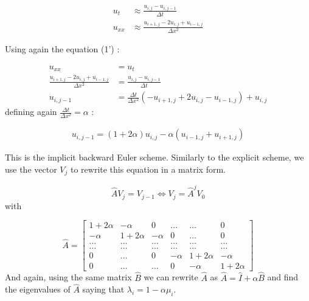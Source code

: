\documentclass[a4paper, twoside, 11pt]{report}
\theoremstyle{theorem}
\theoremstyle{remark}
\theoremstyle{exemple}
\begin{document}
                    \begin{align*}
                        u_t & \approx \frac{u_{i,j} - u_{i,j-1}}{\Delta t} \\
                        u_{xx} &\approx \frac{u_{i+1,j}-2u_{i,j}+u_{i-1,j}}{\Delta x^2}
                    \end{align*}

                    Using again the equation (1') :

                    \begin{align*}
                        u_{xx}&=u_t\\
                        \frac{u_{i+1,j}-2u_{i,j}+u_{i-1,j}}{\Delta x^2} &=    \frac{u_{i,j} - u_{i,j-1}}{\Delta t}\\
                        u_{i,j-1}&=\frac{\Delta t}{\Delta x^2}(-u_{i+1,j}+2u_{i,j}-u_{i-1,j})+u_{i,j}
                    \end{align*}
                    defining again $\displaystyle \frac{\Delta t}{\Delta x^2}=\alpha$ :

                    \begin{align*}
                        u_{i,j-1}=(1+2\alpha)u_{i,j}-\alpha(u_{i-1,j}+u_{i+1,j})
                        \tag{4}
                    \end{align*}

                    This is the implicit backward Euler scheme. Similarly to the explicit scheme, we use the vector $V_j$ to rewrite this equation in a matrix form.

                    \begin{equation*}
                        \hat{A}V_j = V_{j-1} \Longleftrightarrow V_j=\hat{A}^j V_0
                    \end{equation*}
                    with

                    \begin{equation*}
                        \hat{A} = \left[\begin{matrix}
                                          1+2\alpha & -\alpha & 0 & \dots & \dots & 0\\
                                          -\alpha & 1+2\alpha & -\alpha & 0 & \dots & 0 \\
                                          \dots & \dots & \dots & \dots & \dots & \dots\\
                                          \dots & \dots & \dots & \dots & \dots & \dots\\
                                          0 & \dots & 0 & -\alpha & 1+2\alpha & -\alpha \\
                                          0 & \dots & \dots & 0 & -\alpha & 1+2\alpha
                                        \end{matrix} \right]
                    \end{equation*}
                    And again, using the same matrix $\hat{B}$ we can rewrite $\hat A$ as $\hat{A}=\hat{I}+\alpha \hat{B}$ and find the eigenvalues of $\hat{A}$ saying that $\lambda_i = 1 - \alpha \mu_i$.
\end{document}
